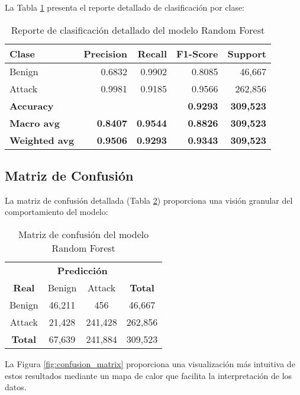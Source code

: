 La Tabla \ref{tab:classification_report} presenta el reporte detallado de clasificación por clase:

\begin{table}[H]
\centering
\begin{tabular}{lrrrr}
\toprule
\textbf{Clase} & \textbf{Precision} & \textbf{Recall} & \textbf{F1-Score} & \textbf{Support} \\
\midrule
Benign & 0.6832 & 0.9902 & 0.8085 & 46,667 \\
Attack & 0.9981 & 0.9185 & 0.9566 & 262,856 \\
\midrule
\textbf{Accuracy} & & & \textbf{0.9293} & \textbf{309,523} \\
\textbf{Macro avg} & \textbf{0.8407} & \textbf{0.9544} & \textbf{0.8826} & \textbf{309,523} \\
\textbf{Weighted avg} & \textbf{0.9506} & \textbf{0.9293} & \textbf{0.9343} & \textbf{309,523} \\
\bottomrule
\end{tabular}
\caption{Reporte de clasificación detallado del modelo Random Forest}
\label{tab:classification_report}
\end{table}

\subsection{Matriz de Confusión}

La matriz de confusión detallada (Tabla \ref{tab:confusion_matrix}) proporciona una visión granular del comportamiento del modelo:

\begin{table}[H]
\centering
\begin{tabular}{c|cc|c}
\toprule
& \multicolumn{2}{c|}{\textbf{Predicción}} & \\
\textbf{Real} & Benign & Attack & \textbf{Total} \\
\midrule
Benign & 46,211 & 456 & 46,667 \\
Attack & 21,428 & 241,428 & 262,856 \\
\midrule
\textbf{Total} & 67,639 & 241,884 & 309,523 \\
\bottomrule
\end{tabular}
\caption{Matriz de confusión del modelo Random Forest}
\label{tab:confusion_matrix}
\end{table}

La Figura \ref{fig:confusion_matrix} proporciona una visualización más intuitiva de estos resultados mediante un mapa de calor que facilita la interpretación de los datos.

